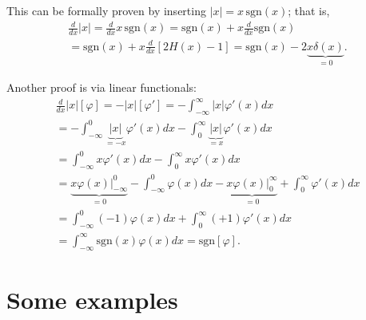 {\color{OliveGreen}
\bproof
This can  be formally proven by inserting
$\left|x\right|  =  {x}\, \textrm{sgn} (x)$; that is,
\begin{equation}
\begin{split}
\frac{d }{dx}  \left|x\right|
=
\frac{d }{dx}x\,\textrm{sgn} (x)
=
\textrm{sgn} (x)  + x\frac{d}{dx} \textrm{sgn} (x)
\\
=
\textrm{sgn} (x)  + x\frac{d }{dx}\left[2H(x)-1\right]
=
\textrm{sgn} (x) - 2\underbrace{x\delta(x)}_{=0}.
\end{split}
 \end{equation}

Another proof is via linear functionals:
\begin{equation}
\begin{split}
\frac{d }{dx}  \left|x\right|   \left[ \varphi \right]
= -  \left|x\right|   \left[ \varphi' \right]
= -\int_{-\infty}^\infty  \left|x\right|   \varphi'  (x) dx
\\
= -\int_{-\infty}^0 \underbrace{\left|x\right|}_{=-x}   \varphi'  (x) dx
- \int_{0}^\infty  \underbrace{\left|x\right|}_{=x}    \varphi'  (x) dx
\\
= \int_{-\infty}^0  x    \varphi'  (x) dx - \int_{0}^\infty   x    \varphi'  (x) dx
\\
= \underbrace{\left. x \varphi   (x)\right|_{-\infty}^0}_{=0}  -  \int_{-\infty}^0    \varphi   (x) dx  -  \underbrace{\left. x \varphi   (x)\right|_0^{\infty}}_{=0}  + \int_{0}^\infty        \varphi'  (x) dx
\\
=   \int_{-\infty}^0    (-1) \varphi   (x) dx      + \int_{0}^\infty  (+1)    \varphi'  (x) dx  \\
=   \int_{-\infty}^\infty     \textrm{sgn}(x) \varphi   (x) dx
= \textrm{sgn}\left[ \varphi \right]
.
\end{split}
 \end{equation}


\eproof
}



\section{Some examples}

